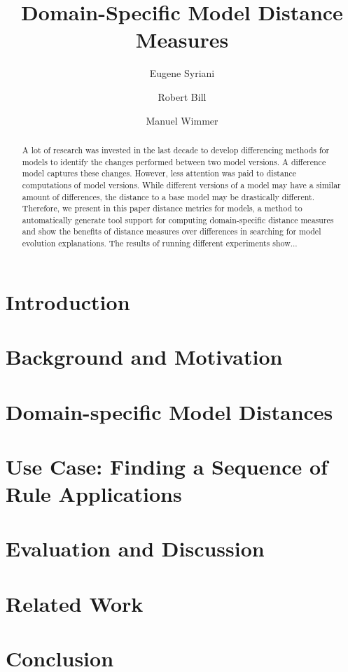 \documentclass{llncs}
\newcommand\es[1]{\nb{ES}{\textcolor{red}{\textsl{#1}}}}
\begin{document}
\title{Domain-Specific Model Distance Measures}

\author{Eugene Syriani \and Robert Bill  \and Manuel Wimmer}

\maketitle

\begin{abstract}
A lot of research was invested in the last decade to develop differencing methods for models to identify the changes performed between two model versions.
A difference model captures these changes. However, less attention was paid to distance computations of model versions. While different versions of a model may have a similar amount of differences,
the distance to a base model may be drastically different. Therefore, we present in this paper distance metrics for models, a method to automatically generate tool support for computing domain-specific distance measures and show the benefits of distance measures over differences in searching for model evolution explanations. The results of running different experiments show...\es{todo}
\end{abstract}


\section{Introduction}\label{sec:intro}


\section{Background and Motivation}\label{sec:background}


\section{Domain-specific Model Distances}\label{sec:metrics}


\section{Use Case: Finding a Sequence of Rule Applications}\label{sec:momot}


\section{Evaluation and Discussion}\label{sec:eval}


\section{Related Work}\label{sec:rw}


\section{Conclusion}\label{sec:conclusion}




\end{document}
